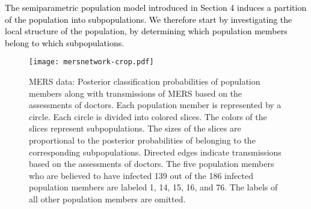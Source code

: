 \documentclass[12pt,usenatbib,referee]{article}
\renewcommand{\alert}{\textcolor{black}}
\begin{document}

\alert{The semiparametric population model introduced in Section 4 induces a partition of the population into subpopulations.
We therefore start by investigating the local structure of the population,
by determining which population members belong to which subpopulations.}

\begin{figure}[htp]
\caption{\label{posterior.class}
MERS data: Posterior classification probabilities of population members along with transmissions of MERS based on the assessments of doctors.
Each population member is represented by a circle.
Each circle is divided into colored slices.
The colors of the slices represent subpopulations.
The sizes of the slices are proportional to the posterior probabilities of belonging to the corresponding subpopulations.
Directed edges indicate transmissions based on the assessments of doctors.
The five population members who are believed to have infected 139 out of the 186 infected population members are labeled 1, 14, 15, 16, and 76.
The labels of all other population members are omitted.}\s
\begin{center}
\texttt{[image: mersnetwork-crop.pdf]}
\end{center}
\end{figure}
\end{document}
